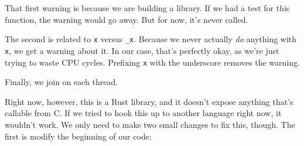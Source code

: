 \documentclass[a4paper,]{book}
\newenvironment{Shaded}{\begin{snugshade}}{\end{snugshade}}
\newcommand{\KeywordTok}[1]{\textcolor[rgb]{0.13,0.29,0.53}{\textbf{{#1}}}}
\newcommand{\CommentTok}[1]{\textcolor[rgb]{0.56,0.35,0.01}{\textit{{#1}}}}
\newcommand{\NormalTok}[1]{{#1}}
\begin{document}
\begin{Shaded}
\end{Shaded}

That first warning is because we are building a library. If we had a
test for this function, the warning would go away. But for now, it's
never called.

The second is related to \texttt{x} versus \texttt{\_x}. Because we
never actually \emph{do} anything with \texttt{x}, we get a warning
about it. In our case, that's perfectly okay, as we're just trying to
waste CPU cycles. Prefixing \texttt{x} with the underscore removes the
warning.

Finally, we join on each thread.

Right now, however, this is a Rust library, and it doesn't expose
anything that's callable from C. If we tried to hook this up to another
language right now, it wouldn't work. We only need to make two small
changes to fix this, though. The first is modify the beginning of our
code:
\end{document}
